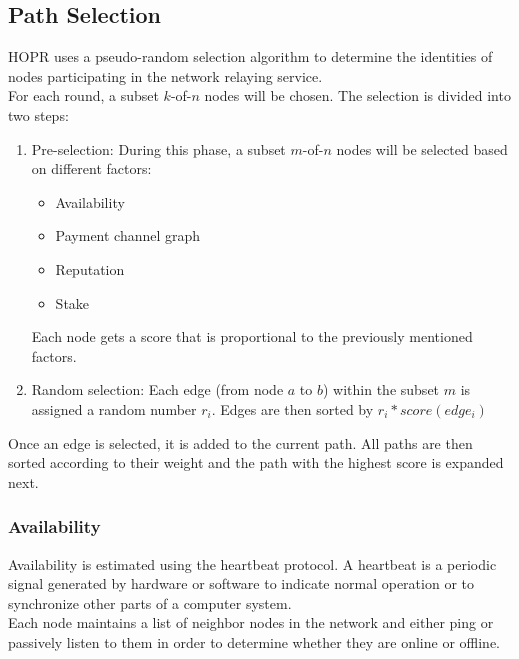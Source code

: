 \subsection{Path Selection}
HOPR uses a pseudo-random selection algorithm to determine the identities of nodes participating in the network relaying service.
\\For each round, a subset $k$-of-$n$ nodes will be chosen. The selection is divided into two steps:
\begin{enumerate}
    \item Pre-selection: 
    During this phase, a subset $m$-of-$n$ nodes will be selected based on different factors:
    \begin{itemize}
        \item Availability
        \item Payment channel graph
        \item Reputation
        \item Stake
    \end{itemize}
Each node gets a score that is proportional to the previously mentioned factors.
\item Random selection: 
Each edge (from node $a$ to $b$) within the subset $m$ is assigned a random number $r_i$. Edges are then sorted by $r_i*score(edge_i)$
\end{enumerate}
Once an edge is selected, it is added to the current path. All paths are then sorted according to their weight and the path with the highest score is expanded next.


\subsubsection{Availability}
Availability is estimated using the heartbeat protocol. A heartbeat is a periodic signal generated by hardware or software to indicate normal operation or to synchronize other parts of a computer system.
\\ Each node maintains a list of neighbor nodes in the network and either ping or passively listen to them in order to determine whether they are online or offline.













    
